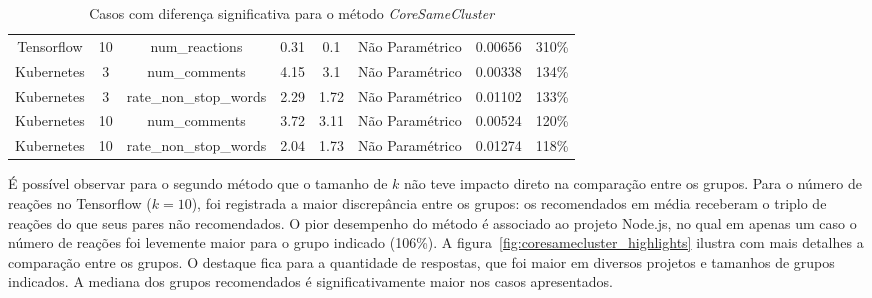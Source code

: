 \documentclass[12pt,openany,oneside,a4paper,english,brazil]{abntbibufjf}
\begin{document}
\begin{table}[htbp]
{\begin{tabular}{|c|c|c|c|c|c|c|c|}
Tensorflow       & 10         & num\_reactions         & 0.31                        & 0.1                             &    Não Paramétrico                    & 0.00656          & 310\%              \\
Kubernetes       & 3          & num\_comments          & 4.15                        & 3.1                             &     Não Paramétrico                   & 0.00338          & 134\%              \\
Kubernetes       & 3          & rate\_non\_stop\_words & 2.29                        & 1.72                            &     Não Paramétrico                   & 0.01102          & 133\%              \\
Kubernetes       & 10         & num\_comments          & 3.72                        & 3.11                            &     Não Paramétrico                   & 0.00524          & 120\%              \\
Kubernetes       & 10         & rate\_non\_stop\_words & 2.04                        & 1.73                            &    Não Paramétrico                    & 0.01274          & 118\%
\end{tabular}%
}
\hline
\caption{Casos com diferença significativa para o método \textit{CoreSameCluster}}
\label{tab:resultados-coresamecluster}
\end{table}

É possível observar para o segundo método que o tamanho de $k$ não teve impacto direto na comparação entre os grupos. Para o número de reações no Tensorflow ($k = 10$), foi registrada a maior discrepância entre os grupos: os recomendados em média receberam o triplo de reações do que seus pares não recomendados. O pior desempenho do método é associado ao projeto Node.js, no qual em apenas um caso o número de reações foi levemente maior para o grupo indicado (106\%). A figura~\ref{fig:coresamecluster_highlights} ilustra com mais detalhes a comparação entre os grupos. O destaque fica para a quantidade de respostas, que foi maior em diversos projetos e tamanhos de grupos indicados. A mediana dos grupos recomendados é significativamente maior nos casos apresentados.
\end{document}
